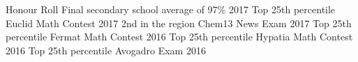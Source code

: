 \begin{cvhonors}
\cvhonor
{Honour Roll}
{Final secondary school average of 97\%}
{}
{2017}
\cvhonor
    {Top 25th percentile}
    {Euclid Math Contest}
    {}
    {2017}
  \cvhonor
    {2nd in the region}
    {Chem13 News Exam}
    {}
    {2017}
  \cvhonor
    {Top 25th percentile}
    {Fermat Math Contest}
    {}
    {2016}
  \cvhonor
    {Top 25th percentile}
    {Hypatia Math Contest}
    {}
    {2016}
  \cvhonor
    {Top 25th percentile}
    {Avogadro Exam}
    {}
    {2016} 
    
\end{cvhonors}

